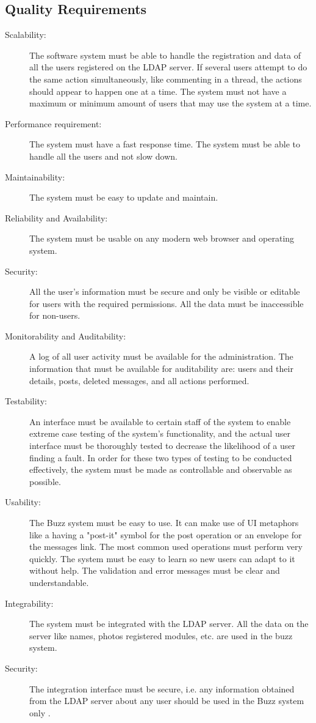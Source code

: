 \documentclass[12pt]{article}
\begin{document}
\subsection{Quality Requirements}
\begin{description}
  \item[Scalability:] 
        The software system must be able to handle the registration and data of all the users registered on the LDAP server. 
       If several users attempt to do the same action simultaneously, like commenting in a thread, the actions should appear to happen one at a time. 
      The system must not have a maximum or minimum amount of users that may use the system at a time.
  \item[Performance requirement:]
      The system must have a fast response time. The system must be able to handle all the users and not slow down.
  \item[Maintainability:] 
      The system must be easy to update and maintain.
  \item[Reliability and Availability:]
      The system must be usable on any modern web browser and operating system.
  \item[Security:]
      All the user's information must be secure and only be visible or editable for users with the required permissions. All the data must be inaccessible for non-users.
  \item[Monitorability and Auditability:]
      A log of all user activity must be available for the administration. The information that must be available for auditability are: users and their details, posts, deleted messages, and all actions performed.
  \item[Testability:]
      An interface must be available to certain staff of the system to enable extreme case testing of the system's functionality, and the actual user interface must be thoroughly tested to decrease the likelihood of a user finding a fault. In order for these two types of testing to be conducted effectively, the system must be made as controllable and observable as possible.
  \item[Usability:]
      The Buzz system must be easy to use. It can make use of UI metaphors like a having a "post-it" symbol for the post operation or an envelope for the messages link.
      The most common used operations must perform very quickly. The system must be easy to learn so new users can adapt to it without help. 
      The validation and error messages must be clear and understandable.
  \item[Integrability:]
      The system must be integrated with the LDAP server. 
      All the data on the server like names, photos registered modules, etc. are used in the buzz system. 
\item[Security:]
The integration interface must be secure, i.e. any information obtained from the LDAP server about any user should be used in the Buzz system only .
\end{description}
\end{document}
